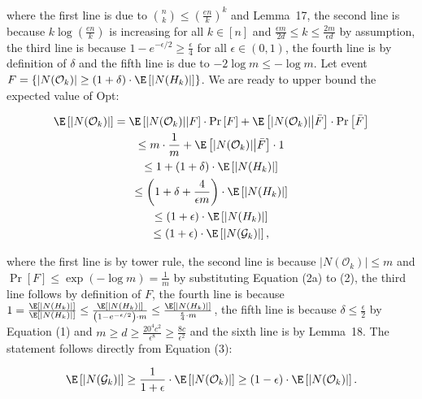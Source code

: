 where the first line is due to $\binom{n}{k}\leq\left(\frac{en}{k}\right)^{k}$ and Lemma 17, the second line is because $k\log\left(\frac{en}{k}\right)$ is increasing for all $k\in[n]$ and $\frac{\epsilon m}{2d}\leq k\leq\frac{2m}{\epsilon d}$ by assumption, the third line is because $1-e^{-\epsilon/2}\geq\frac{\epsilon}{4}$ for all $\epsilon\in(0,1)$, the fourth line is by definition of $\delta$ and the fifth line is due to $-2\log{m}\leq-\log{m}$.
Let event $F=\{|N(\mathcal{O}_{k})|\geq(1+\delta)\cdot\E\left[|N(H_{k})|\right]\}$.
We are ready to upper bound the expected value of Opt:\par


\[\begin{gathered}
\displaystyle\E\left[|N(\mathcal{O}_{k})|\right] \displaystyle=\E\left[|N(\mathcal{O}_{k})|\middle|F\right]\cdot\Pr\left[F\right]+\E\left[|N(\mathcal{O}_{k})|\middle|\bar{F}\right]\cdot\Pr\left[\bar{F}\right] \\
\displaystyle\leq m\cdot\frac{1}{m}+\E\left[|N(\mathcal{O}_{k})|\middle|\bar{F}\right]\cdot 1 \\
\displaystyle\leq 1+(1+\delta)\cdot\E\left[|N(H_{k})|\right] \\
\displaystyle\leq\left(1+\delta+\frac{4}{\epsilon m}\right)\cdot\E\left[|N(H_{k})|\right] \\
\displaystyle\leq\left(1+\epsilon\right)\cdot\E\left[|N(H_{k})|\right] \\
\displaystyle\leq\left(1+\epsilon\right)\cdot\E\left[|N(\mathcal{G}_{k})|\right],
\end{gathered}\]


where the first line is by tower rule, the second line is because $|N(\mathcal{O}_{k})|\leq m$ and $\Pr\left[F\right]\leq\exp\left(-\log{m}\right)=\frac{1}{m}$ by substituting Equation (2a) to (2), the third line follows by definition of $F$, the fourth line is because $1=\frac{\E\left[|N(H_{k})|\right]}{\E\left[|N(H_{k})|\right]}\leq\frac{\E\left[|N(H_{k})|\right]}{\left(1-e^{-\epsilon/2}\right)\cdot m}\leq\frac{\E\left[|N(H_{k})|\right]}{\frac{\epsilon}{4}\cdot m}$, the fifth line is because $\delta\leq\frac{\epsilon}{2}$ by Equation (1) and $m\geq d\geq\frac{20^{4}c^{2}}{\epsilon^{8}}\geq\frac{8c}{\epsilon^{2}}$ and the sixth line is by Lemma 18.
The statement follows directly from Equation (3):\par


\[\begin{gathered}
\displaystyle\E\left[|N(\mathcal{G}_{k})|\right]\geq\frac{1}{1+\epsilon}\cdot\E\left[|N(\mathcal{O}_{k})|\right]\geq\left(1-\epsilon\right)\cdot\E\left[|N(\mathcal{O}_{k})|\right].
\end{gathered}\]


